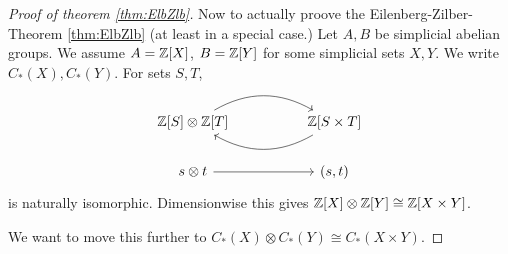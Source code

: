 \documentclass[language=english]{TemplateLecture}
\begin{document}
\begin{proof}[Proof of theorem \ref{thm:ElbZlb}]
    Now to actually proove the Eilenberg-Zilber-Theorem \ref{thm:ElbZlb} (at least in a special case.) Let \(A,B\) be simplicial abelian groups. We assume \(A = \mathbb{Z}[X]\), \(B= \mathbb{Z}[Y]\) for some simplicial sets \(X,Y\). We write \(C_*(X), C_*(Y)\). For sets \(S,T\),
    \[\begin{tikzcd}
        \IZ[S] \otimes \IZ[T] \ar[rr, bend left] && \IZ[S \times T] \ar[ll, bend left] \\
        s\otimes t \ar[rr] && (s,t)
    \end{tikzcd}\]
    is naturally isomorphic. Dimensionwise this gives \(\mathbb{Z}[X] \otimes \mathbb{Z}[Y] \cong \mathbb{Z}[X \times Y]\).

    We want to move this further to \(C_*(X) \otimes C_*(Y) \cong C_*(X\times Y)\).


\end{proof}
\end{document}
